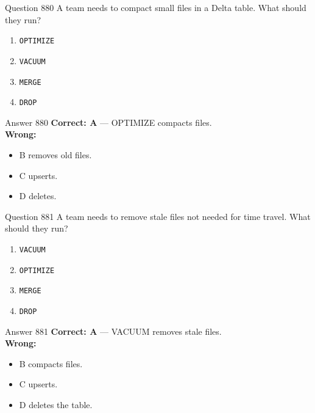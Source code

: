 \documentclass[aspectratio=169,11pt]{beamer}
\begin{document}
	\begin{frame}{Question 880}
		A team needs to compact small files in a Delta table. What should they run?
		\begin{enumerate}[label=\Alph*.]
			\item \texttt{OPTIMIZE}
			\item \texttt{VACUUM}
			\item \texttt{MERGE}
			\item \texttt{DROP}
		\end{enumerate}
	\end{frame}
	\begin{frame}{Answer 880}
		\textbf{Correct: A} --- OPTIMIZE compacts files.\\
		\vspace{0.5em}
		\textbf{Wrong:}
		\begin{itemize}
			\item B removes old files.
			\item C upserts.
			\item D deletes.
		\end{itemize}
	\end{frame}
	
	\begin{frame}{Question 881}
		A team needs to remove stale files not needed for time travel. What should they run?
		\begin{enumerate}[label=\Alph*.]
			\item \texttt{VACUUM}
			\item \texttt{OPTIMIZE}
			\item \texttt{MERGE}
			\item \texttt{DROP}
		\end{enumerate}
	\end{frame}
	\begin{frame}{Answer 881}
		\textbf{Correct: A} --- VACUUM removes stale files.\\
		\vspace{0.5em}
		\textbf{Wrong:}
		\begin{itemize}
			\item B compacts files.
			\item C upserts.
			\item D deletes the table.
		\end{itemize}
	\end{frame}
	
\end{document}

